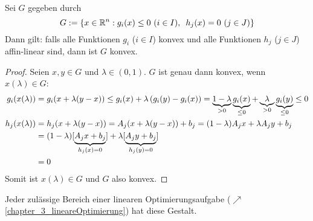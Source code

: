 \begin{aussage} %
	Sei $G$ gegeben durch
	\begin{equation*}
		G \mathrel{:=} \left\{ x \in \mathbb{R}^n : g_i(x) \le 0 \ (i \in I), \enskip h_j(x) = 0 \ (j \in J) \right\}
	\end{equation*}
	Dann gilt: falls alle Funktionen $g_i$ ($i \in I$) konvex und alle Funktionen $h_j$ ($j \in J$) affin-linear sind, dann ist $G$ konvex.
\end{aussage}
\begin{proof}
	Seien $x,y \in G$ und $\lambda \in (0,1)$. $G$ ist genau dann konvex, wenn $x(\lambda) \in G$:
	\begin{equation*}
		\begin{aligned}
		g_i(x(\lambda)) &= g_i(x + \lambda (y-x)) \le g_i(x) + \lambda \left( g_i(y) - g_i(x) \right) = \underbrace{1-\lambda}_{>0} \underbrace{g_i(x)}_{\le 0} + \underbrace{\lambda}_{>0} \underbrace{g_i(y)}_{\le 0} 
		\le 0 \\
		h_j(x(\lambda)) &= h_j(x + \lambda(y-x)) = A_j(x+\lambda(y-x)) + b_j = (1-\lambda) A_j x + \lambda A_j y + b_j \\
		&= (1-\lambda) [\underbrace{A_j x + b_j}_{h_j(x) = 0}] + \lambda [\underbrace{A_j y + b_j}_{h_j(y) = 0}] \\
		&= 0
		\end{aligned}
	\end{equation*}
	Somit ist $x(\lambda) \in G$ und $G$ also konvex.
\end{proof}

Jeder zulässige Bereich einer linearen Optimierungsaufgabe ($\nearrow$ \cref{chapter_3_lineareOptimierung}) hat diese Gestalt.